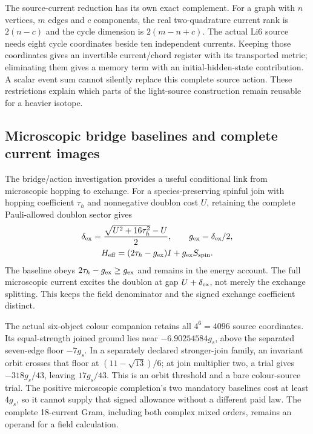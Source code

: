 The source-current reduction has its own exact complement. For a graph
with $n$ vertices, $m$ edges and $c$ components, the real two-quadrature
current rank is $2(n-c)$ and the cycle dimension is $2(m-n+c)$. The actual
Li6 source needs eight cycle coordinates beside ten independent currents.
Keeping those coordinates gives an invertible current/chord register with
its transported metric; eliminating them gives a memory term with an
initial-hidden-state contribution. A scalar event sum cannot silently
replace this complete source action. These restrictions explain which parts
of the light-source construction remain reusable for a heavier isotope.

\subsection{Microscopic bridge baselines and complete current images}

The bridge/action investigation provides a useful conditional link from
microscopic hopping to exchange. For a species-preserving spinful join with
hopping coefficient $\tau_h$ and nonnegative doublon cost $U$, retaining
the complete Pauli-allowed doublon sector gives
\begin{equation}
\begin{gathered}
\delta_{\rm ex}=\frac{\sqrt{U^2+16\tau_h^2}-U}{2},\qquad
 g_{\rm ex}=\delta_{\rm ex}/2,\\
H_{\rm eff}=(2\tau_h-g_{\rm ex})I+g_{\rm ex}S_{\rm spin}.
\end{gathered}
\end{equation}
The baseline obeys $2\tau_h-g_{\rm ex}\geq g_{\rm ex}$ and remains in the
energy account. The full microscopic current excites the doublon at gap
$U+\delta_{\rm ex}$, not merely the exchange splitting. This keeps the
field denominator and the signed exchange coefficient distinct.

The actual six-object colour companion retains all $4^6=4096$ source
coordinates. Its equal-strength joined ground lies near $-6.90254584g_s$,
above the separated seven-edge floor $-7g_s$. In a separately declared
stronger-join family, an invariant orbit crosses that floor at
$(11-\sqrt{13})/6$; at join multiplier two, a trial gives
$-318g_s/43$, leaving $17g_s/43$. This is an orbit threshold and a bare
colour-source trial. The positive microscopic completion's two mandatory
baselines cost at least $4g_s$, so it cannot supply that signed allowance
without a different paid law. The complete 18-current Gram, including both
complex mixed orders, remains an operand for a field calculation.

